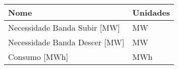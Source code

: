 \begin{tabular}{ll}
\toprule
Nome & Unidades \\
\midrule
Necessidade Banda Subir [MW] & MW \\
Necessidade Banda Descer [MW] & MW \\
Consumo [MWh] & MWh \\
\bottomrule
\end{tabular}
